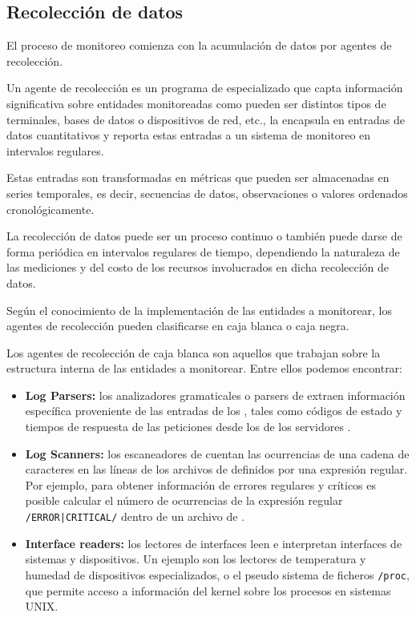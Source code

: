 \subsection{Recolección de datos}
\label{recoleccion-de-datos}

El proceso de monitoreo comienza con la acumulación de datos por agentes de
recolección.

Un agente de recolección es un programa de  especializado que
capta información significativa sobre entidades monitoreadas como pueden ser
distintos tipos de terminales, bases de datos o dispositivos de red, etc., la
encapsula en entradas de datos cuantitativos y reporta estas entradas a un
sistema de monitoreo en intervalos regulares.

Estas entradas son transformadas en métricas que pueden ser almacenadas en
series temporales, es decir, secuencias de datos, observaciones o valores
ordenados cronológicamente.

La recolección de datos puede ser un proceso continuo o también puede darse de
forma periódica en intervalos regulares de tiempo, dependiendo la naturaleza de
las mediciones y del costo de los recursos involucrados en dicha recolección de
datos.

Según el conocimiento de la implementación de las entidades a monitorear, los
agentes de recolección pueden clasificarse en caja blanca o caja negra.

Los agentes de recolección de caja blanca son aquellos que trabajan sobre la
estructura interna de las entidades a monitorear. Entre ellos podemos
encontrar:

\begin{itemize}
  \item \textbf{Log Parsers:} los analizadores gramaticales o parsers de 
    extraen información específica proveniente de las entradas de los ,
    tales como códigos de estado y tiempos de respuesta de las peticiones desde
    los  de los servidores .

  \item \textbf{Log Scanners:} los escaneadores de  cuentan las
    ocurrencias de una cadena de caracteres en las líneas de los archivos de
     definidos por una expresión regular. Por ejemplo, para obtener
    información de errores regulares y críticos es posible calcular el número de
    ocurrencias de la expresión regular \texttt{/ERROR|CRITICAL/} dentro de un
    archivo de .

  \item \textbf{Interface readers:} los lectores de interfaces leen e
    interpretan interfaces de sistemas y dispositivos. Un ejemplo son los
    lectores de temperatura y humedad de dispositivos especializados, o el
    pseudo sistema de ficheros \texttt{/proc}, que permite acceso a información
    del kernel sobre los procesos en sistemas UNIX.
\end{itemize}

